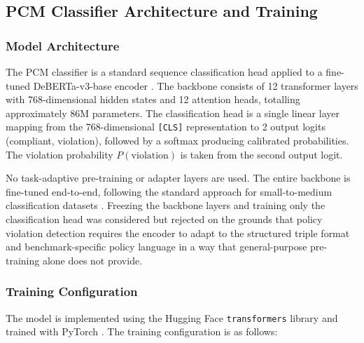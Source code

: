 \documentclass[12pt,a4paper]{article}
\begin{document}
\subsection{PCM Classifier Architecture and Training}

\subsubsection{Model Architecture}

The PCM classifier is a standard sequence classification head applied to a
fine-tuned DeBERTa-v3-base encoder \citep{he2023debertav3}. The backbone
consists of 12 transformer layers with 768-dimensional hidden states and 12
attention heads, totalling approximately 86M parameters. The classification head
is a single linear layer mapping from the 768-dimensional \texttt{[CLS]}
representation to 2 output logits (compliant, violation), followed by a softmax
producing calibrated probabilities. The violation probability $P(\text{violation})$
is taken from the second output logit.

No task-adaptive pre-training or adapter layers are used. The entire backbone
is fine-tuned end-to-end, following the standard approach for small-to-medium
classification datasets \citep{devlin2019bert,liu2019roberta}. Freezing the
backbone layers and training only the classification head was considered but
rejected on the grounds that policy violation detection requires the encoder to
adapt to the structured triple format and benchmark-specific policy language in
a way that general-purpose pre-training alone does not provide.

\subsubsection{Training Configuration}

The model is implemented using the Hugging Face \texttt{transformers} library
\citep{wolf2020transformers} and trained with PyTorch \citep{paszke2019pytorch}.
The training configuration is as follows:
\end{document}

